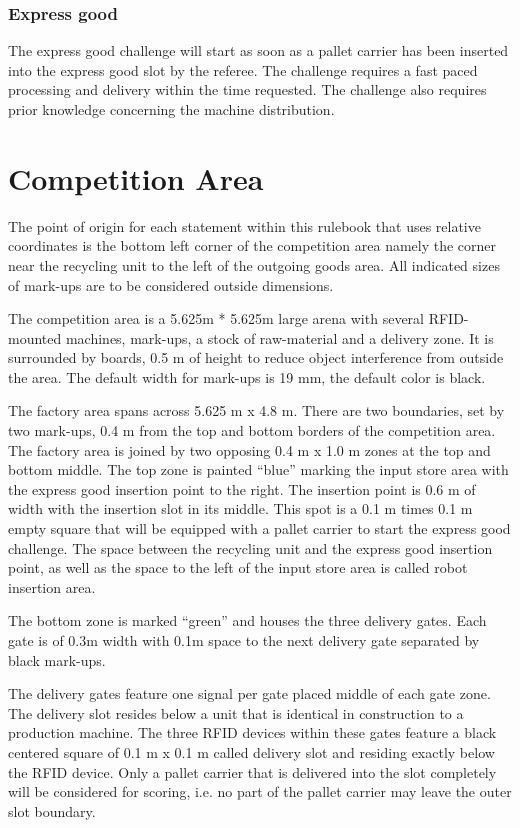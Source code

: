 \documentclass[12pt,twoside]{article}
\begin{document}
\subsubsection{Express good}

The express good challenge will start as soon as a pallet carrier has
been inserted into the express good slot by the referee. The challenge
requires a fast paced processing and delivery within the time
requested. The challenge also requires prior knowledge concerning the
machine distribution.

\section{Competition Area}

The point of origin for each statement within this rulebook that uses
relative coordinates is the bottom left corner of the competition area
namely the corner near the recycling unit to the left of the outgoing
goods area. All indicated sizes of mark-ups are to be considered
outside dimensions.

The competition area is a 5.625m * 5.625m large arena with several
RFID-mounted machines, mark-ups, a stock of raw-material and a
delivery zone. It is surrounded by boards, 0.5 m of height to reduce
object interference from outside the area. The default width for
mark-ups is 19 mm, the default color is black.

The factory area spans across 5.625 m x 4.8 m. There are two
boundaries, set by two mark-ups, 0.4 m from the top and bottom borders
of the competition area. The factory area is joined by two opposing
0.4 m x 1.0 m zones at the top and bottom middle. The top zone is
painted “blue” marking the input store area with the express good
insertion point to the right. The insertion point is 0.6 m of width
with the insertion slot in its middle. This spot is a 0.1 m times 0.1
m empty square that will be equipped with a pallet carrier to start
the express good challenge. The space between the recycling unit and
the express good insertion point, as well as the space to the left of
the input store area is called robot insertion area.

The bottom zone is marked “green” and houses the three delivery gates.
Each gate is of 0.3m width with 0.1m space to the next delivery gate
separated by black mark-ups.

The delivery gates feature one signal per gate placed middle of each
gate zone. The delivery slot resides below a unit that is identical in
construction to a production machine. The three RFID devices within
these gates feature a black centered square of 0.1 m x 0.1 m called
delivery slot and residing exactly below the RFID device. Only a
pallet carrier that is delivered into the slot completely will be
considered for scoring, i.e. no part of the pallet carrier may leave
the outer slot boundary.
\end{document}
